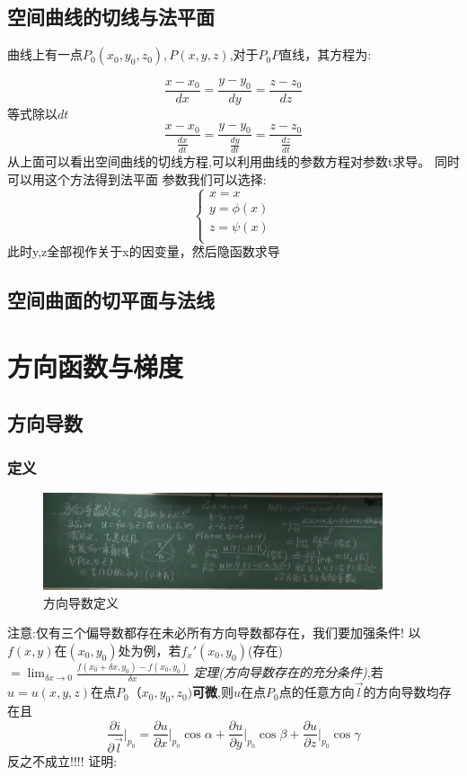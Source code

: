 \documentclass{ctexart}
\begin{document}
      \subsection{空间曲线的切线与法平面}
        曲线上有一点$P_0(x_0,y_0,z_0),P(x,y,z)$,对于$P_0P$直线，其方程为:

        $$\frac{x-x_0}{dx} = \frac{y-y_0}{dy} = \frac{z-z_0}{dz}$$
        等式除以$dt$
        $$\frac{x-x_0}{\frac{dx}{dt}} = \frac{y-y_0}{\frac{dy}{dt}} = \frac{z-z_0}{\frac{dz}{dt}}$$
        从上面可以看出空间曲线的切线方程,可以利用曲线的参数方程对参数t求导。
        同时可以用这个方法得到法平面
        参数我们可以选择:
        $$\begin{cases}
          x = x\\
          y = \phi(x)\\
          z = \psi(x)\\
        \end{cases}$$
        此时y,z全部视作关于x的因变量，然后隐函数求导
      \subsection{空间曲面的切平面与法线}
  \section{方向函数与梯度}
      \subsection{方向导数}
      \subsubsection{定义}
      \begin{figure}[htbp]
        \centering
        \caption{方向导数定义}

        \includegraphics[width = 10cm]{PictureNote/fangxiangdaoshudingyi.png}

      \end{figure}
      注意:仅有三个偏导数都存在未必所有方向导数都存在，我们要加强条件! 
      以$f(x,y)$在$(x_0,y_0)$处为例，若$f_x'(x_0,y_0)$(存在)$= \lim_{\delta x \to 0} {\frac{f(x_0+\delta x,y_0)-f(x_0,y_0)}{\delta x}}$
      \emph{定理(方向导数存在的充分条件)},若$u=u(x,y,z)$在点$P_0（x_0,y_0,z_0)$\textbf{可微},则$u$在点$P_0$点的任意方向$\vec l$的方向导数均存在且
      $$\frac{\partial i}{\partial \vec l}\vert_{p_0} = \frac{\partial u}{\partial x}\vert_{p_0} \cos \alpha + \frac{\partial u}{\partial y}\vert_{p_0} \cos \beta + \frac{\partial u}{\partial z}\vert_{p_0} \cos \gamma$$
      反之不成立!!!!
      证明: 
\end{document}

